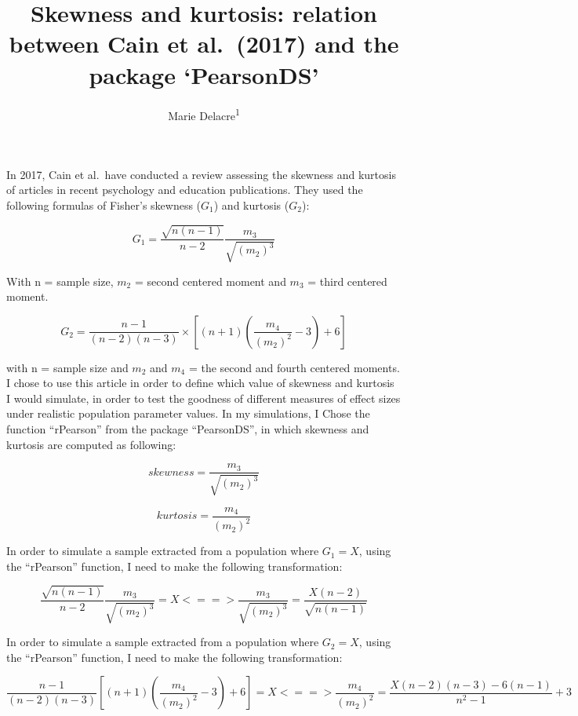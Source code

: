\documentclass[
  man]{apa6}
\affiliation{
\vspace{0.5cm}
\textsuperscript{1} Service of Analysis of the Data, Université Libre de Bruxelles, Belgium}
\title{Skewness and kurtosis: relation between Cain et al.~(2017) and the package `PearsonDS'}
\author{Marie Delacre\textsuperscript{1}}
\date{}
\begin{document}
\maketitle

In 2017, Cain et al.~have conducted a review assessing the skewness and kurtosis of articles in recent psychology and education publications. They used the following formulas of Fisher's skewness (\(G_{1}\)) and kurtosis (\(G_{2}\)):

\begin{equation} 
G_{1}=\frac{\sqrt{n(n-1)}}{n-2} \frac{m_{3}}{\sqrt{(m_{2})^3}}
\label{eq:skew}
\end{equation}

With n = sample size, \(m_{2}\) = second centered moment and \(m_{3}\) = third centered moment.

\begin{equation} 
G_{2}=\frac{n-1}{(n-2)(n-3)}\times [(n+1)(\frac{m_{4}}{(m_{2})^2}-3)+6]
\label{eq:kurt}
\end{equation}

with n = sample size and \(m_{2}\) and \(m_{4}\) = the second and fourth centered moments. I chose to use this article in order to define which value of skewness and kurtosis I would simulate, in order to test the goodness of different measures of effect sizes under realistic population parameter values. In my simulations, I Chose the function \enquote{rPearson} from the package \enquote{PearsonDS}, in which skewness and kurtosis are computed as following:

\begin{equation} 
skewness=\frac{m_{3}}{\sqrt{(m_{2})^3}}
\label{eq:skewnessrPearson}
\end{equation}

\begin{equation} 
kurtosis=\frac{m_{4}}{(m_{2})^2}
\label{eq:kurtosisrPearson}
\end{equation}

In order to simulate a sample extracted from a population where \(G_{1}= X\), using the \enquote{rPearson} function, I need to make the following transformation:

\begin{equation} 
\frac{\sqrt{n(n-1)}}{n-2} \frac{m_{3}}{\sqrt{(m_{2})^3}} = X
<==> \frac{m_{3}}{\sqrt{(m_{2})^3}} = \frac{X(n-2)}{\sqrt{n(n-1)}}
\label{eq:skewnesstransformation}
\end{equation}

In order to simulate a sample extracted from a population where \(G_{2}= X\), using the \enquote{rPearson} function, I need to make the following transformation:

\begin{equation} 
\frac{n-1}{(n-2)(n-3)} [(n+1)(\frac{m_{4}}{(m_{2})^2}-3)+6] = X  
<==> \frac{m_{4}}{(m_{2})^2}=\frac{X(n-2)(n-3)-6(n-1)}{n^2-1}+3
\label{eq:kurtosistransformation}
\end{equation}
\end{document}
